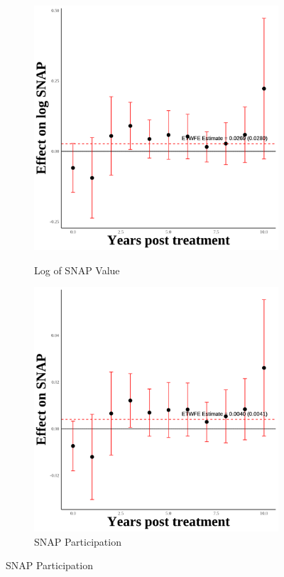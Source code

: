 \documentclass[12pt,english]{article}
\begin{document}
\begin{figure}[H]
  \begin{subfigure}[b]{0.3\textwidth}
    \centering
    \caption{Log of SNAP Value}
    \includegraphics[width=\linewidth]{figures/plot60-ln_snap_event_study-third-one.png}
    \label{fig:ln-snap-third-one}
  \end{subfigure}
  \hfill
  \begin{subfigure}[b]{0.3\textwidth}
    \centering
    \caption{SNAP Participation}
    \includegraphics[width=\linewidth]{figures/plot61-snap_event_study-third-one.png}

\end{subfigure}
\end{figure}
\end{document}
